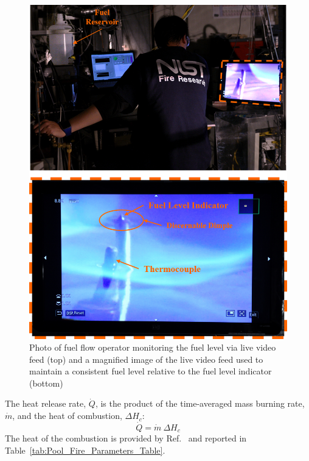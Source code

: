 \documentclass[12pt]{article}
\begin{document}
\begin{figure}[h!]
	\centering
\includegraphics[width=14.0cm,keepaspectratio]{Monitoring_Fuel_Level_A.png}
	\caption[Photographs of the fuel monitoring process]{Photo of fuel flow operator monitoring the fuel level via live video feed (top) and a magnified image of the live video feed used to maintain a consistent fuel level relative to the fuel level indicator (bottom)}
	\label{fig:Fuel_Level}
\end{figure}

The heat release rate, $\dot{Q}$, is the product of the time-averaged mass burning rate, $\dot{m}$, and the heat of combustion, $\Delta H_{c}$:
\begin{equation}\label{eq:Heat_release_rate}
\dot{Q}= \dot{m}~\Delta H_{c}
\end{equation}
The heat of the combustion is provided by Ref.~\cite{Dippr} and reported in Table~\ref{tab:Pool_Fire_Parameters_Table}.
\end{document}
